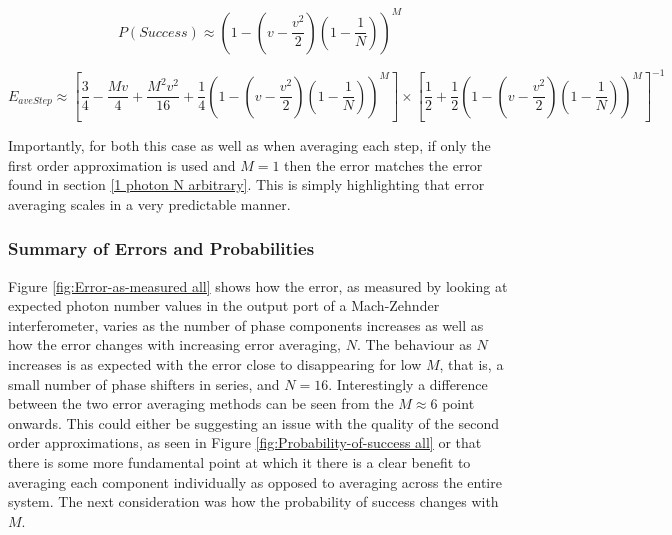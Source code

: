 \documentclass[aps,pra,twocolumn,superscriptaddress,numerical]{revtex4-1}
\begin{document}
			\begin{equation}
				P\left(Success\right)\approx\left(1-\left(v-\frac{v^{2}}{2}\right)\left(1-\frac{1}{N}\right)\right)^{M}\label{eq:AvStepProbSuccess}
			\end{equation}
			
			
			\begin{widetext}
				\begin{equation}
					E_{aveStep} \approx  \left[\frac{3}{4}-\frac{Mv}{4}+\frac{M^{2}v^{2}}{16}+\frac{1}{4}\left(1-\left(v-\frac{v^{2}}{2}\right)\left(1-\frac{1}{N}\right)\right)^{M}\right]\nonumber\times\left[\frac{1}{2}+\frac{1}{2}\left(1-\left(v-\frac{v^{2}}{2}\right)\left(1-\frac{1}{N}\right)\right)^{M}\right]^{-1}\label{eq:ErrorAvStep}
				\end{equation}
			\end{widetext}	
			
			Importantly, for both this case as well as when averaging each step, if only the first order approximation is used and $M=1$ then the error matches the error found in section \ref{1 photon N arbitrary}. This is simply highlighting that error averaging scales in a very predictable manner.
			
			
		\subsubsection{Summary of Errors and Probabilities\label{Summary of Errors and Probabilities}}
			
			Figure \ref{fig:Error-as-measured all} shows how the error, as measured by looking at expected photon number values in the output port of a Mach-Zehnder interferometer, varies as the number of phase components increases as well as how the error changes with increasing error averaging, $N$. The behaviour as $N$ increases is as expected with the error close to disappearing for low $M$, that is, a small number of phase shifters in series, and $N=16$. Interestingly a difference between the two error averaging methods can be seen from the $M\approx6$ point onwards. This could either be suggesting an issue with the quality of the second order approximations, as seen in Figure \ref{fig:Probability-of-success all}	or that there is some more fundamental point at which it there is a clear benefit to averaging each component individually as opposed to averaging across the entire system. The next consideration was how the probability of success changes with $M$.
			
\end{document}
